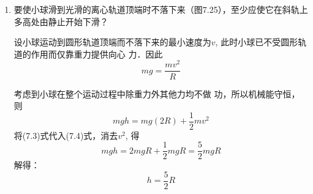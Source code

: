 \begin{enumerate}
\begin{solution}
    设斜坡长为$\ell$, 人滑至斜面底端时的速度为$v$. 在下
    滑过程中，重力做功为$mgh$, 摩擦力做功为
\[-\mu mg\ell \cos\theta=-\mu mg\cos\theta\cdot \frac{h}{\sin\theta}=-\mu\frac{mgh}{\tan\theta}\]

根据动能定理：
\begin{equation}
    mgh-\frac{\mu mgh}{\tan\theta}=\frac{1}{2}mv^2
\end{equation}
在水平面上滑行阶段，只有摩擦力做功，则根据动能定理
可得．
\begin{equation}
    -\mu mgs_1=-\frac{1}{2}mv^2
\end{equation}
(7.1)式和(7.2)式相加，消去$\frac{1}{2}mv^2$，得
\[mgh-\frac{mu mgh}{\tan\theta}-\mu mgs_1=0\]
解得：\[s_1=\frac{h}{\mu}-\frac{h}{\tan\theta}\]
又因为$s-s_1=\dfrac{h}{\tan\theta}$，所以
\[s=s_1+\frac{h}{\tan\theta}=\frac{h}{\mu}-\frac{h}{\tan\theta}+\frac{h}{\tan\theta}=\frac{h}{\mu}\]
可见，$s$与角度$\theta$无关，所以若改变斜坡倾角$\theta$, 水平距离$s$将
不改变．

说明：这一题如果把斜面和平面上的运动看作是一个运
动过程，也可以同样应用动能定理．但此时摩擦力做功要分
两段计算后相加．因为在这两个阶段中，摩擦力的大小是不
同的，全过程的动能定理形式应为：
\[mgh-\frac{mu mgh}{\tan\theta}-\mu mgs_1=0\]
与前一种解法中消去
$\frac{1}{2}mv^2$后的式子一样，但对一般同学来
说，还是分段应用动能定理为好．
\end{solution}
\item 要使小球滑到光滑的离心轨道顶端时不落下来（图7.25），至少应使它在斜轨上多高处由静止开始下滑？


\begin{figure}[htp]\centering
    \caption{}
\end{figure}


\begin{solution}
    设小球运动到圆形轨道顶端而不落下来的最小速度为$v$, 此时小球已不受圆形轨道的作用而仅靠重力提供向心
    力．因此
    \begin{equation}
        mg=\frac{mv^2}{R}
    \end{equation}

    考虑到小球在整个运动过程中除重力外其他力均不做
    功，所以机械能守恒，则
\begin{equation}
    mgh=mg(2R)+\frac{1}{2}mv^2
\end{equation}
将(7.3)式代入(7.4)式，消去$v^2$, 得
\[mgh=2mgR+\frac{1}{2}mgR=\frac{5}{2}mgR\]
解得：
\[h=\frac{5}{2}R\]
\end{solution}
\end{enumerate}


